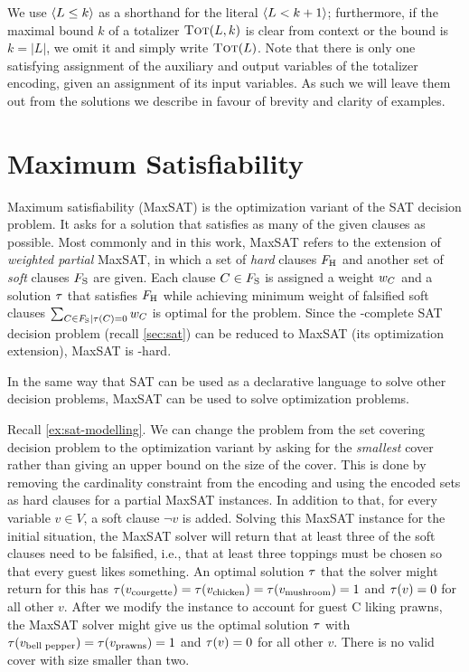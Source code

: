 We use $\langle L \leq k \rangle$ as a shorthand for the literal $\langle L < k+1 \rangle$;
furthermore, if the maximal bound $k$ of a totalizer $\textsc{Tot}(L,k)$ is clear from context or the bound is $k=|L|$, we omit it and simply write $\textsc{Tot}(L)$.
Note that there is only one satisfying assignment of the auxiliary and output variables of the totalizer encoding, given an assignment of its input variables.
As such we will leave them out from the solutions we describe in favour of brevity and clarity of examples. 

\section{Maximum Satisfiability\label{sec:max-sat}}

Maximum satisfiability (MaxSAT) is the optimization variant of the SAT decision problem.
It asks for a solution that satisfies as many of the given clauses as possible.
Most commonly and in this work, MaxSAT refers to the extension of \emph{weighted partial} MaxSAT, in which a set of \emph{hard} clauses $F_\text{H}$ and another set of \emph{soft} clauses $F_\text{S}$ are given.
Each clause $C \in F_\text{S}$ is assigned a weight $w_C$ and a solution $\tau$ that satisfies $F_\text{H}$ while achieving minimum weight of falsified soft clauses $\sum_{C\in F_\text{S} \mid \tau(C)=0} w_C$ is optimal for the problem.
Since the \NP-complete SAT decision problem (recall \cref{sec:sat}) can be reduced to MaxSAT (its optimization extension), MaxSAT is \NP-hard.

In the same way that SAT can be used as a declarative language to solve other decision problems, MaxSAT can be used to solve optimization problems.

\begin{example}\label{ex:maxsat-modelling}
  Recall \cref{ex:sat-modelling}.
  We can change the problem from the set covering decision problem to the optimization variant by asking for the \emph{smallest} cover rather than giving an upper bound on the size of the cover.
  This is done by removing the cardinality constraint from the encoding and using the encoded sets as hard clauses for a partial MaxSAT instances.
  In addition to that, for every variable $v\in V$, a soft clause $\lnot v$ is added.
  Solving this MaxSAT instance for the initial situation, the MaxSAT solver will return that at least three of the soft clauses need to be falsified, i.e., that at least three toppings must be chosen so that every guest likes something.
  An optimal solution $\tau$ that the solver might return for this has $\tau(v_\text{courgette}) = \tau(v_\text{chicken}) = \tau(v_\text{mushroom}) = 1$ and $\tau(v) = 0$ for all other $v$.
  After we modify the instance to account for guest C liking prawns, the MaxSAT solver might give us the optimal solution $\tau$ with $\tau(v_\text{bell pepper}) = \tau(v_\text{prawns}) = 1$ and $\tau(v) = 0$ for all other $v$.
  There is no valid cover with size smaller than two.
\end{example}

